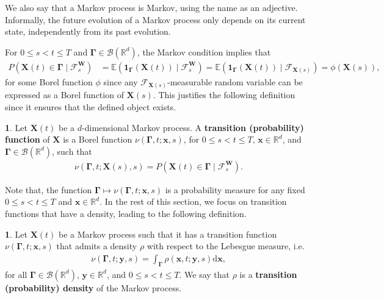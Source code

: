\documentclass[english]{article}
\numberwithin{equation}{section}
\numberwithin{figure}{section}
\theoremstyle{bolddescit}
\theoremstyle{definition}
\newtheorem{definition}[theorem]{\protect\definitionname}
\theoremstyle{definition}
\theoremstyle{plain}
\theoremstyle{plain}
\theoremstyle{bolddesc}
\theoremstyle{plain}
\theoremstyle{remark}
\providecommand{\definitionname}{Definition}
\begin{document}
We also say that a Markov process is Markov, using the name as an adjective. Informally, the future evolution of a Markov process only depends on its current state, independently from its past evolution.

For $0 \le s < t \le T$ and $\mathbf{\Gamma} \in \mathcal{B}({\mathbb{R}^d})$, the Markov condition implies that
\begin{align*}
  P(\mathbf{X}(t) \in \mathbf{\Gamma} \mid \mathcal{F}^\mathbf{W}_s)
  &= \mathbb{E}(\mathbf{1}_\mathbf{\Gamma}(\mathbf{X}(t)) \mid \mathcal{F}^\mathbf{W}_s)
  = \mathbb{E}(\mathbf{1}_\mathbf{\Gamma}(\mathbf{X}(t)) \mid \mathcal{F}_{\mathbf{X}(s)})
  = \phi(\mathbf{X}(s)),
\end{align*}
for some Borel function $\phi$ since any $\mathcal{F}_{\mathbf{X}(s)}$-measurable random variable can be expressed as a Borel function of $\mathbf{X}(s)$.
This justifies the following definition since it ensures that the defined object exists.

\begin{definition}
  Let $\mathbf{X}(t)$ be a $d$-dimensional Markov process. A \textbf{transition (probability) function} of $\mathbf{X}$ is a Borel function $\nu(\mathbf{\Gamma}, t; \mathbf{x}, s)$, for $0 \le s < t \le T$, $\mathbf{x} \in \mathbb{R}^d$, and $\mathbf{\Gamma} \in \mathcal{B}(\mathbb{R}^d)$, such that
  \begin{align}
    \nu(\mathbf{\Gamma}, t; \mathbf{X}(s), s) = P(\mathbf{X}(t) \in \mathbf{\Gamma} \mid \mathcal{F}^\mathbf{W}_s).\label{eq:fp-transition-function}
  \end{align}
\end{definition}

Note that, the function $\mathbf{\Gamma} \mapsto \nu(\mathbf{\Gamma}, t; \mathbf{x}, s)$ is a probability measure for any fixed $0 \le s < t \le T$ and $\mathbf{x} \in \mathbb{R}^d$. In the rest of this section, we focus on transition functions that have a density, leading to the following definition.

\begin{definition}
  Let $\mathbf{X}(t)$ be a Markov process such that it has a transition function $\nu(\mathbf{\Gamma},t;\mathbf{x},s)$ that admits a density $\rho$ with respect to the Lebesgue measure, i.e.
  \begin{align*}
    \nu(\mathbf{\Gamma},t;\mathbf{y},s) = \int_\mathbf{\Gamma} \rho(\mathbf{x},t;\mathbf{y},s) \mathrm{d}\mathbf{x},
  \end{align*}
  for all $\mathbf{\Gamma} \in \mathcal{B}(\mathbb{R}^d)$, $\mathbf{y} \in \mathbb{R}^d$, and $0 \le s < t \le T$.
  We say that $\rho$ is a \textbf{transition (probability) density} of the Markov process.
\end{definition}
\end{document}
